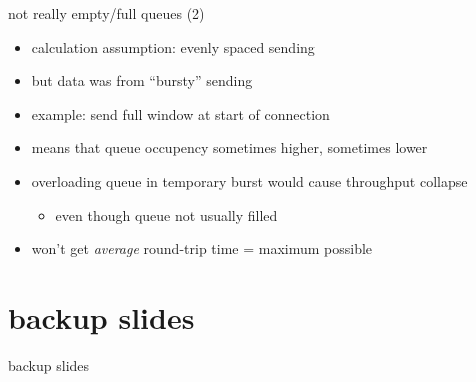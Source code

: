 \begin{frame}{not really empty/full queues (2)}
    \begin{itemize}
    \item calculation assumption: evenly spaced sending
    \item but data was from ``bursty'' sending
    \item example: send full window at start of connection
    \vspace{.5cm}
    \item means that queue occupency sometimes higher, sometimes lower
    \vspace{.5cm}
    \item overloading queue in temporary burst would cause throughput collapse
        \begin{itemize}
        \item even though queue not usually filled
        \end{itemize}
    \item won't get \textit{average} round-trip time = maximum possible
    \end{itemize}
\end{frame}



\section{backup slides}
\begin{frame}{backup slides}
\end{frame}


